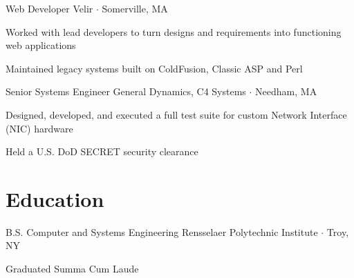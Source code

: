 \documentclass{article}
\begin{document}
\begin{paracol}{2}
\begin{rightcolumn}
{Web Developer}
{Velir $\cdot$ Somerville, MA}{%
\begin{itemize*}
  \item Worked with lead developers to turn designs and requirements into functioning web applications
  \item Maintained legacy systems built on ColdFusion, Classic ASP and Perl
\end{itemize*}
}

{Senior Systems Engineer}
{General Dynamics, C4 Systems $\cdot$ Needham, MA}{%
\begin{itemize*}
  \item Designed, developed, and executed a full test suite for custom Network Interface (NIC) hardware
  \item Held a U.S. DoD SECRET security clearance
\end{itemize*}
}

\section*{Education}

{B.S. Computer and Systems Engineering}
{Rensselaer Polytechnic Institute $\cdot$ Troy, NY}{%
\begin{itemize*}
  \item Graduated Summa Cum Laude
\end{itemize*}
}
\end{rightcolumn}
\end{paracol}
\end{document}
